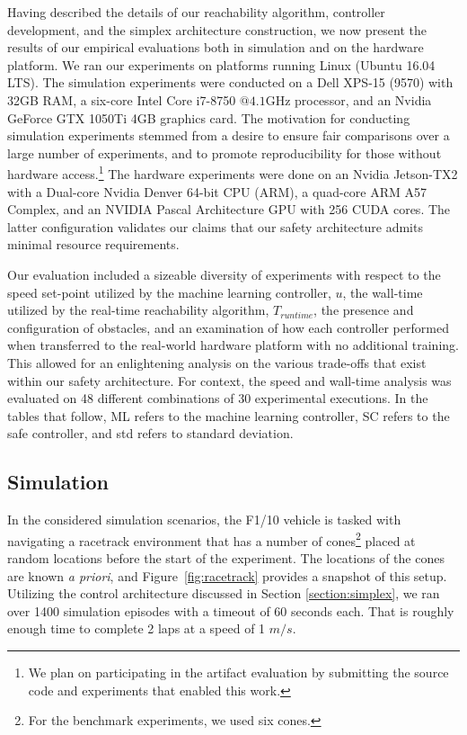\documentclass[manuscript,screen,review]{acmart}
\begin{document}
Having described the details of our reachability algorithm, controller development, and the simplex architecture construction, we now present the results of our empirical evaluations both in simulation and on the hardware platform. We ran our experiments on platforms running Linux (Ubuntu 16.04 LTS). The simulation experiments were conducted on a Dell XPS-15 (9570) with 32GB RAM, a six-core Intel Core i7-8750 $@ 4.1\textrm{GHz}$ processor, and an Nvidia GeForce GTX 1050Ti 4GB graphics card. The motivation for conducting simulation experiments stemmed from a desire to ensure fair comparisons over a large number of experiments, and to promote reproducibility for those without hardware access.\footnote{We plan on participating in the artifact evaluation by submitting the source code and experiments that enabled this work.} The hardware experiments were done on an Nvidia Jetson-TX2 with a Dual-core Nvidia Denver 64-bit CPU (ARM), a quad-core ARM A57 Complex, and an NVIDIA Pascal Architecture GPU with 256 CUDA cores. The latter configuration validates our claims that our safety architecture admits minimal resource requirements. 


Our evaluation included a sizeable diversity of experiments with respect to the speed set-point utilized by the machine learning controller, $u$, the wall-time utilized by the real-time reachability algorithm, $T_{runtime}$, the presence and configuration of obstacles, and an examination of how each controller performed when transferred to the real-world hardware platform with no additional training. This allowed for an enlightening analysis on the various trade-offs that exist within our safety architecture. For context, the speed and wall-time analysis was evaluated on 48 different combinations of 30 experimental executions. %
In the tables that follow, ML refers to the machine learning controller, SC refers to the safe controller, and std refers to standard deviation. %

\subsection{Simulation}
In the considered simulation scenarios, the F1/10 vehicle is tasked with navigating a racetrack environment that has a number of cones\footnote{For the benchmark experiments, we used six cones.} placed at random locations before the start of the experiment. The locations of the cones are known \emph{a priori}, and Figure~\ref{fig:racetrack} provides a snapshot of this setup. Utilizing the control architecture discussed in Section \ref{section:simplex}, we ran over 1400 simulation episodes with a timeout of 60 seconds each. That is roughly enough time to complete 2 laps at a speed of 1 $m/s$. %
\end{document}

